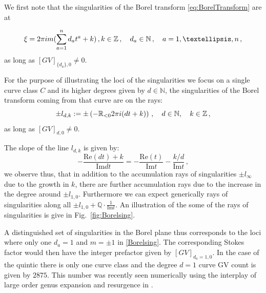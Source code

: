 \documentclass[a4paper,12pt,justification=centering]{article}
\numberwithin{equation}{section}
\newcommand{\ii}{\textnormal{i}}
\theoremstyle{plain}%
\theoremstyle{definition}
\begin{document}
We first note that the singularities of the Borel transform \eqref{eq:BorelTransform} are at 

\begin{equation}\label{Borelsing}
\xi= 2\pi \ii m (\sum_{a=1}^{n} d_a t^a + k)\,, k\in\mathbb{Z}\,, \quad d_a \in \mathbb{N}\,, \quad a=1,\dots,n\,,
\end{equation}
as long as $[GV]_{\{d_a\}  ,0}\ne0$.

For the purpose of illustrating the loci of the singularities we focus on a single curve class $C$ and its higher degrees given by $d\in\mathbb{N}$, the singularities of the Borel transform coming from that curve are on the rays:
\begin{equation}
\pm l_{d,k}:=\pm\left( -\mathbb{R}_{<0} 2\pi \ii (dt + k) \right)\,, \quad d\in\mathbb{N},\quad  k\in \mathbb{Z}\,,
\end{equation}
as long as $[GV]_{d,0}\ne 0$.

The slope of the line $ l_{d,k}$ is given by:
\begin{equation}
- \frac{\textrm{Re}(d t)+ k}{\textrm{Im}dt}=  - \frac{\textrm{Re}( t)}{\textrm{Im} t} - \frac{k/d}{\textrm{Im}t}\,,
\end{equation} 
we observe thus, that in addition to the accumulation rays of singularities $\pm l_{\infty}$ due to the growth in $k$, there are further accumulation rays due to the increase in the degree around $\pm l_{1,0}$. Furthermore we can expect generically rays of singularities along all $\pm l_{1,0} + \mathbb{Q}\cdot \frac{1}{\textrm{Im}t}$. An illustration of the some of the rays of singularities is give in Fig.~\ref{fig:Borelsing}.

A distinguished set of singularities in the Borel plane thus corresponds to the loci where only one $d_a=1$ and $m=\pm 1$ in \eqref{Borelsing}. The corresponding Stokes factor would then have the integer prefactor given by $[GV]_{d_a=1,0}$. In the case of the quintic there is only one curve class and the degree $d=1$ curve GV count is given by $2875$. This number was recently seen numerically using the interplay of large order genus expansion and resurgence in \cite{Gu:2023mgf}.
\end{document}
